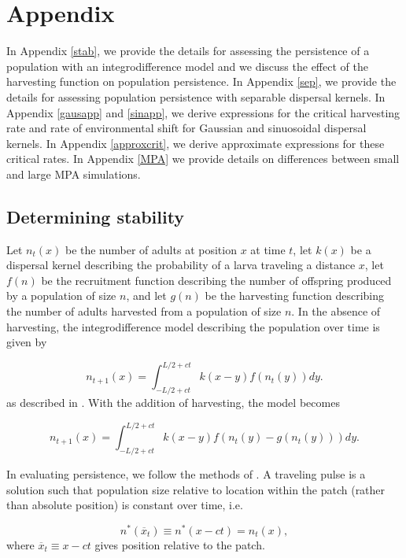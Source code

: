 \documentclass[12pt,english]{article}
\begin{document}
\appendix
\section{Appendix}
In Appendix \ref{stab}, we provide the details for assessing the persistence of a population with an integrodifference model and we discuss the effect of the harvesting function on population persistence.  In Appendix \ref{sep}, we provide the details for assessing population persistence with separable dispersal kernels.  In Appendix \ref{gausapp} and \ref{sinapp}, we derive expressions for the critical harvesting rate and rate of environmental shift for Gaussian and sinuosoidal dispersal kernels.  In Appendix \ref{approxcrit}, we derive approximate expressions for these critical rates. In Appendix \ref{MPA} we provide details on differences between small and large MPA simulations. 

\subsection{Determining stability \label{stab}}
Let $n_t(x)$ be the number of adults at position $x$ at time $t$, let $k(x)$ be a dispersal kernel describing the probability of a larva traveling a distance $x$, let $f(n)$ be the recruitment function describing the number of offspring produced by a population of size $n$, and let $g(n)$ be the harvesting function describing the number of adults harvested from a population of size $n$.  In the absence of harvesting, the integrodifference model describing the population over time is given by 

\begin{equation} n_{t+1}(x)=\int_{-L/2+ct}^{L/2+ct}k(x-y)f(n_t(y))dy. \label{integro} \end{equation}
as described in \citep{ZhouKot2011}.  With the addition of harvesting, the model becomes

\begin{equation} n_{t+1}(x)=\int_{-L/2+ct}^{L/2+ct}k(x-y)f(n_t(y)-g(n_t(y)))dy. \label{integro} \end{equation}

In evaluating persistence, we follow the methods of \citep{ZhouKot2011}.  A traveling pulse is a solution such that population size relative to location within the patch (rather than absolute position) is constant over time, i.e. 

\begin{equation*}
n^*(\overline{x}_t)\equiv n^*(x-ct)=n_t(x),   \label{trav} 
\end{equation*}
where $\overline{x}_t\equiv x-ct$ gives position relative to the patch. 
\end{document}
